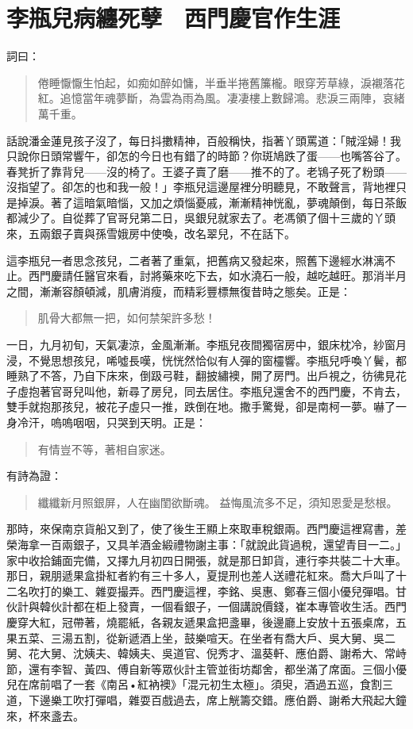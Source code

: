 
\chapter{李瓶兒病纏死孽　西門慶官作生涯}

詞曰：
\begin{quote}
倦睡懨懨生怕起，如痴如醉如慵，半垂半捲舊簾櫳。眼穿芳草綠，淚襯落花紅。追憶當年魂夢斷，為雲為雨為風。凄凄樓上數歸鴻。悲淚三兩陣，哀緒萬千重。
\end{quote}

話說潘金蓮見孩子沒了，每日抖擻精神，百般稱快，指著丫頭罵道：「賊淫婦！我只說你日頭常響午，卻怎的今日也有錯了的時節？你斑鳩跌了蛋——也嘴答谷了。春凳折了靠背兒——沒的椅了。王婆子賣了磨——推不的了。老鴇子死了粉頭——沒指望了。卻怎的也和我一般！」李瓶兒這邊屋裡分明聽見，不敢聲言，背地裡只是掉淚。著了這暗氣暗惱，又加之煩惱憂戚，漸漸精神恍亂，夢魂顛倒，每日茶飯都減少了。自從葬了官哥兒第二日，吳銀兒就家去了。老馮領了個十三歲的丫頭來，五兩銀子賣與孫雪娥房中使喚，改名翠兒，不在話下。

這李瓶兒一者思念孩兒，二者著了重氣，把舊病又發起來，照舊下邊經水淋漓不止。西門慶請任醫官來看，討將藥來吃下去，如水澆石一般，越吃越旺。那消半月之間，漸漸容顏頓減，肌膚消瘦，而精彩豐標無復昔時之態矣。正是：
\begin{quote}
肌骨大都無一把，如何禁架許多愁！
\end{quote}
一日，九月初旬，天氣凄涼，金風漸漸。李瓶兒夜間獨宿房中，銀床枕冷，紗窗月浸，不覺思想孩兒，唏噓長嘆，恍恍然恰似有人彈的窗欞響。李瓶兒呼喚丫鬢，都睡熟了不答，乃自下床來，倒趿弓鞋，翻披繡襖，開了房門。出戶視之，彷彿見花子虛抱著官哥兒叫他，新尋了房兒，同去居住。李瓶兒還舍不的西門慶，不肯去，雙手就抱那孩兒，被花子虛只一推，跌倒在地。撒手驚覺，卻是南柯一夢。嚇了一身冷汗，嗚嗚咽咽，只哭到天明。正是：
\begin{quote}
有情豈不等，著相自家迷。
\end{quote}
有詩為證：
\begin{quote}
纖纖新月照銀屏，人在幽閨欲斷魂。
益悔風流多不足，須知恩愛是愁根。
\end{quote}

那時，來保南京貨船又到了，使了後生王顯上來取車稅銀兩。西門慶這裡寫書，差榮海拿一百兩銀子，又具羊酒金緞禮物謝主事：「就說此貨過稅，還望青目一二。」家中收拾鋪面完備，又擇九月初四日開張，就是那日卸貨，連行李共裝二十大車。那日，親朋遞果盒掛紅者約有三十多人，夏提刑也差人送禮花紅來。喬大戶叫了十二名吹打的樂工、雜耍撮弄。西門慶這裡，李銘、吳惠、鄭春三個小優兒彈唱。甘伙計與韓伙計都在柜上發賣，一個看銀子，一個講說價錢，崔本專管收生活。西門慶穿大紅，冠帶著，燒罷紙，各親友遞果盒把盞畢，後邊廳上安放十五張桌席，五果五菜、三湯五割，從新遞酒上坐，鼓樂喧天。在坐者有喬大戶、吳大舅、吳二舅、花大舅、沈姨夫、韓姨夫、吳道官、倪秀才、溫葵軒、應伯爵、謝希大、常峙節，還有李智、黃四、傅自新等眾伙計主管並街坊鄰舍，都坐滿了席面。三個小優兒在席前唱了一套《南呂•紅衲襖》「混元初生太極」。須臾，酒過五巡，食割三道，下邊樂工吹打彈唱，雜耍百戲過去，席上觥籌交錯。應伯爵、謝希大飛起大鐘來，杯來盞去。

